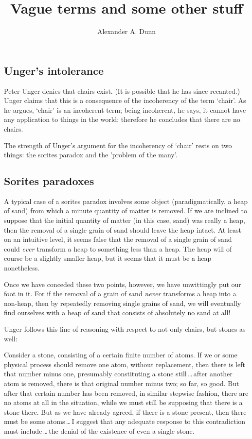 \documentclass[11pt]{article}
\title{Vague terms and some other stuff}
\author{Alexander A. Dunn}
\newenvironment{squote}{%
\begin{spacing}{1}
       	\begin{list}{}{%
\setlength{\labelwidth}{0pt}%
\rightmargin\leftmargin%
}
\item\relax
}{%
\end{list}%
\end{spacing}
}
\begin{document}
\ifstandalone
\maketitle
\begin{spacing}{1.5}
\fi

\section{Unger's intolerance}
Peter Unger denies that chairs exist.  (It is possible that he has
since recanted.)  Unger claims that this is a consequence of the
incoherency of the term `chair'.  As he argues, `chair' is an
incoherent term; being incoherent, he says, it cannot have any
application to things in the world; therefore he concludes that there
are no chairs.

The strength of Unger's argument for the incoherency of `chair' rests
on two things: the sorites paradox and the 'problem of the many'.

\subsection{Sorites paradoxes}
A typical case of a sorites paradox involves some object
(paradigmatically, a heap of sand) from which a minute quantity of
matter is removed.  If we are inclined to suppose that the initial
quantity of matter (in this case, sand) was really a heap, then the
removal of a single grain of sand should leave the heap intact.  At
least on an intuitive level, it seems false that the removal of a
single grain of sand could {\em ever} transform a heap to something
less than a heap.  The heap will of course be a slightly smaller heap,
but it seems that it must be a heap nonetheless.

Once we have conceded these two points, however, we have unwittingly
put our foot in it.  For if the removal of a grain of sand {\em never}
transforms a heap into a non-heap, then by repeatedly removing single
grains of sand, we will eventually find ourselves with a heap of sand
that consists of absolutely no sand at all!

Unger follows this line of reasoning with respect to not only chairs,
but stones as well:

\begin{squote}
Consider a stone, consisting of a certain finite number of atoms.  If
we or some physical process should remove one atom, without
replacement, then there is left that number minus one, presumably
constituting a stone still\,\ldots\,after another atom is removed,
there is that original number minus two; so far, so good.  But after
that certain number has been removed, in similar stepwise fashion,
there are no atoms at all in the situation, while we must still be
supposing that there is a stone there.  But as we have already agreed,
if there is a stone present, then there must be some atoms\,\ldots\,I
suggest that any adequate response to this contradiction must
include\,\ldots\,the denial of the existence of even a single
stone.~\citep[121--122]{unger1979}
\end{squote}


\end{spacing}
\end{document}

